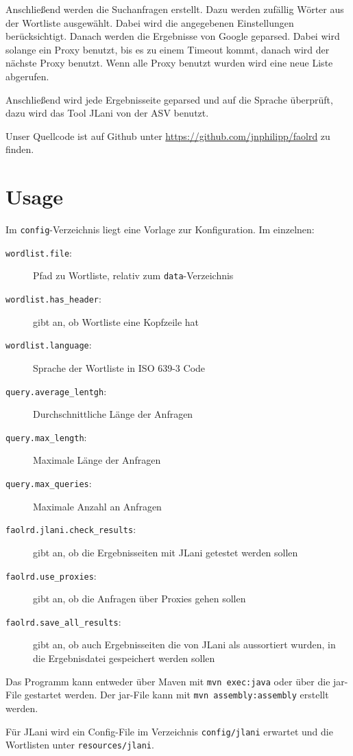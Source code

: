 \documentclass[a4paper, 12pt]{article}
\begin{document}
Anschließend werden die Suchanfragen erstellt. Dazu werden zufällig Wörter aus der Wortliste ausgewählt. Dabei wird die angegebenen Einstellungen berücksichtigt. Danach werden die Ergebnisse von Google geparsed. Dabei wird solange ein Proxy benutzt, bis es zu einem Timeout kommt, danach wird der nächste Proxy benutzt. Wenn alle Proxy benutzt wurden wird eine neue Liste abgerufen.

Anschließend wird jede Ergebnisseite geparsed und auf die Sprache überprüft, dazu wird das Tool JLani von der ASV benutzt.

Unser Quellcode ist auf Github unter \url{https://github.com/jnphilipp/faolrd} zu finden.

\section{Usage}
Im \texttt{config}-Verzeichnis liegt eine Vorlage zur Konfiguration. Im einzelnen:
\begin{description}
\item[\texttt{wordlist.file}:] Pfad zu Wortliste, relativ zum \texttt{data}-Verzeichnis
\item[\texttt{wordlist.has\_header}:] gibt an, ob Wortliste eine Kopfzeile hat
\item[\texttt{wordlist.language}:] Sprache der Wortliste in ISO 639-3 Code
\item[\texttt{query.average\_lentgh}:] Durchschnittliche Länge der Anfragen
\item[\texttt{query.max\_length}:] Maximale Länge der Anfragen
\item[\texttt{query.max\_queries}:] Maximale Anzahl an Anfragen
\item[\texttt{faolrd.jlani.check\_results}:] gibt an, ob die Ergebnisseiten mit JLani getestet werden sollen
\item[\texttt{faolrd.use\_proxies}:] gibt an, ob die Anfragen über Proxies gehen sollen
\item[\texttt{faolrd.save\_all\_results}:] gibt an, ob auch Ergebnisseiten die von JLani als aussortiert wurden, in die Ergebnisdatei gespeichert werden sollen
\end{description}

Das Programm kann entweder über Maven mit \texttt{mvn exec:java} oder über die jar-File gestartet werden. Der jar-File kann mit \texttt{mvn assembly:assembly} erstellt werden.

Für JLani wird ein Config-File im Verzeichnis \texttt{config/jlani} erwartet und die Wortlisten unter \texttt{resources/jlani}.
\end{document}
